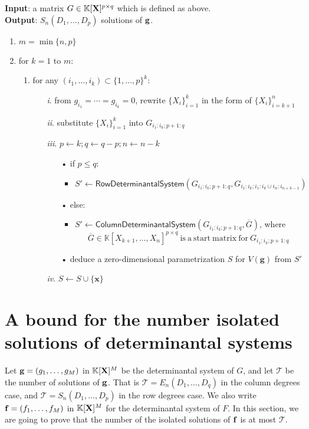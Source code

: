 \documentclass[11pt]{article}
\numberwithin{Property}{section}
\numberwithin{Theorem}{section}
\numberwithin{Proposition}{section}
\numberwithin{Lemma}{section}
\numberwithin{Corollary}{section}
\numberwithin{Definition}{section}
\numberwithin{Remark}{section}
\numberwithin{Conjecture}{section}
\numberwithin{Problem}{section}
\numberwithin{Claim}{section}
\theoremstyle{definition}
\numberwithin{Example}{section}
\def\g {\ensuremath{\mathbf{g}}}
\renewcommand{\leq}{\leqslant}
\def\bar{\overline}
\newcommand{\field}{\mathbb{K}} %
\newcommand{\mat}[1]{\mathbf{\MakeUppercase{#1}}} %
\begin{document}
\begin{algorithm}[]
\caption{$\mathsf{Start Matrix Row Degrees}$}
\label{StartMatRow}
{\bf Input}: a matrix $G \in \field[\mat{X}]^{p \times q}$ which is defined as above.\\
{\bf Output}: $S_{n}(D_1, \ldots, D_p)$ solutions of ${\bf g}$.
\begin{enumerate}
\item $m = \min \{n,p\}$
\item for $k = 1$ to $m$: 
\begin{enumerate}
\item for any  $(i_1, \ldots, i_k) \subset \{1, \ldots, p\}^k$:
\begin{itemize}
\item[\emph{i}.] from $g_{i_1} = \cdots = g_{i_k} = 0$, rewrite $\{X_i\}_{i = 1}^k$ in the form of $\{X_{i}\}_{i=k+1}^n$
\item[\emph{ii}.] substitute $\{X_i\}_{i = 1}^k$ into $G_{i_1:i_k\mathbf{;}p+1:q}$
\item[\emph{iii}.] $p \gets k; q \gets q-p; n \gets n - k$
\begin{itemize}
\item[•] if $p \leq q$:
\begin{itemize}
\item $S' \gets \mathsf{RowDeterminantal System}(G_{i_1:i_k\mathbf{;}p+1:q}, G_{i_1:i_k;i_1:i_k \cup i_{n}:i_{n+k-1}})$
\end{itemize}

\item[•] else:
\begin{itemize}
\item $S'\gets \mathsf{ColumnDeterminantal System}(G_{i_1:i_k\mathbf{;}p+1:q},\bar{G})$, where 
\[\bar{G} \in \field[X_{k+1}, \ldots, X_n]^{p \times q} \ \mathrm{is \ a \ start \ matrix \ for} \ G_{i_1:i_k\mathbf{;}p+1:q} \] 
\end{itemize}
\item[•] deduce a zero-dimensional parametrization $S$ for $V(\g)$ from $S'$
\end{itemize}
\item[\emph{iv}.] $S \gets S \cup \{\mathbf{x}\}$
\end{itemize}
\end{enumerate}
\end{enumerate} 
\end{algorithm}
\section{A bound for the number isolated solutions of determinantal systems}
\label{sec:bounddegree}
Let ${\bf g} = (g_1, \ldots, g_M)$ in $\field[\mat{X}]^M$ be the determinantal system of $G$, and let $\mathcal{T}$ be the number of solutions of ${\bf g}$. That is $\mathcal{T} = E_{n}(D_1, \ldots, D_q)$ in the column degrees case, and $\mathcal{T} = S_{n}(D_1, \ldots, D_p)$ in the row degrees case. We also write ${\bf f} = (f_1, \ldots, f_M)$ in $\field[\mat{X}]^M$ for the determinantal system of $F$. In this section, we are going to prove that the number of the isolated solutions of ${\bf f}$ is at most $\mathcal{T}$. 
\end{document}
